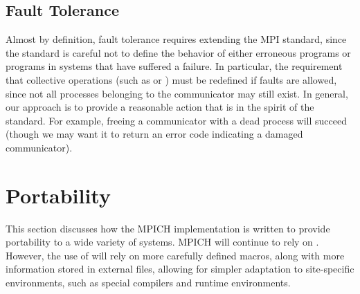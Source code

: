 \documentclass{article}
\begin{document}


\subsection{Fault Tolerance}
Almost by definition, fault tolerance requires extending the MPI
standard, since the standard is careful not to define the behavior of
either erroneous programs or programs in systems that have suffered a
failure.  In particular, the requirement that collective operations
(such as  or ) must be
redefined if faults are allowed, since not all processes belonging to
the communicator may still exist.  In general, our approach is to
provide a reasonable action that is in the spirit of the standard.
For example, freeing a communicator with a dead process will succeed
(though we may want it to return an error code indicating a damaged
communicator).  

\section{Portability}
\label{sec:portability}

This section discusses how the MPICH implementation is written to
provide portability to a wide variety of systems.  MPICH will continue
to rely on .  However, the use of 
will rely on more carefully defined macros, along with more
information stored in external files, allowing for simpler adaptation
to site-specific environments, such as special compilers and runtime
environments. 

\end{document}
